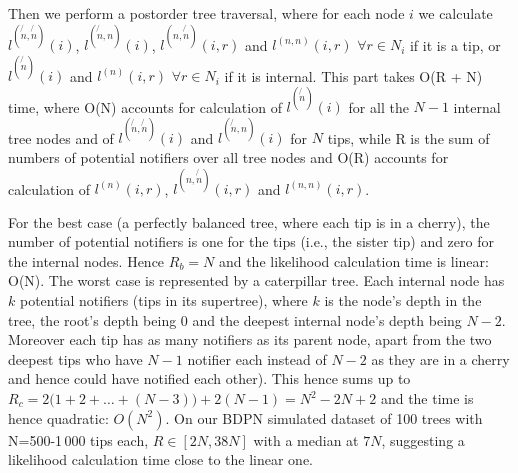 \documentclass[10pt,letterpaper]{article}
\begin{document}
 Then we perform a postorder tree traversal, where for each node $i$ we calculate $l^{(\not{n}, \not{n})}(i)$, $l^{(\not{n}, n)}(i)$, $l^{(n, \not{n})}(i, r)$ and $l^{(n, n)}(i, r)$ $\forall r \in N_i$ if it is a tip, or $l^{(\not{n})}(i)$ and $l^{(n)}(i, r)$ $\forall r \in N_i$ if it is internal.
This part takes O(R + N) time, where O(N) accounts for calculation of $l^{(\not{n})}(i)$ for all the $N - 1$ internal tree nodes and of $l^{(\not{n}, \not{n})}(i)$ and $l^{(\not{n}, n)}(i)$ for $N$ tips, while R is the sum of numbers of potential notifiers over all tree nodes and O(R) accounts for calculation of $l^{(n)}(i, r)$, $l^{(n, \not{n})}(i, r)$ and $l^{(n, n)}(i, r)$. 

For the best case (a perfectly balanced tree, where each tip is in a cherry), the number of potential notifiers is one for the tips (i.e., the sister tip) and zero for the internal nodes. Hence $R_b = N$ and the likelihood calculation time is linear: O(N). The worst case  is represented by a caterpillar tree. Each internal node has $k$ potential notifiers (tips in its supertree), where $k$ is the node's depth in the tree, the root's depth being 0 and the deepest internal node's depth being $N-2$. Moreover each tip has as many notifiers as its parent node, apart from the two deepest tips who have $N-1$ notifier each instead of $N-2$ as they are in a cherry and hence could have notified each other). This hence sums up to $R_c = 2\big(1 + 2 + \ldots + (N-3)\big) + 2(N-1) = N^2 - 2N + 2$ and the time is hence quadratic: $O(N^2)$. On our BDPN simulated dataset of 100 trees with N=500-1\,000 tips each, $R \in [2N, 38N]$ with a median at $7N$, suggesting a likelihood calculation time close to the linear one.
\end{document}
